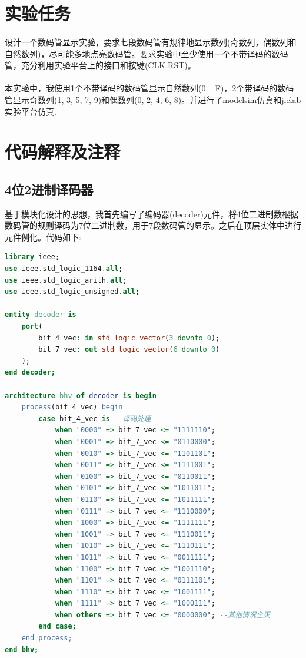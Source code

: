 \documentclass[UTF8, onecolumn, a4paper]{article}
\begin{document}
\section{实验任务}
\paragraph*{}
设计一个数码管显示实验，要求七段数码管有规律地显示数列(奇数列，偶数列和自然数列)，尽可能多地点亮数码管。要求实验中至少使用一个不带译码的数码管，充分利用实验平台上的接口和按键(CLK,RST)。
\paragraph*{}
本实验中，我使用1个不带译码的数码管显示自然数列(0 ~ F)，2个带译码的数码管显示奇数列(1, 3, 5, 7, 9)和偶数列(0, 2, 4, 6, 8)。并进行了modelsim仿真和jielab实验平台仿真.

\section{代码解释及注释}
\subsection{4位2进制译码器}
基于模块化设计的思想，我首先编写了编码器(decoder)元件，将4位二进制数根据数码管的规则译码为7位二进制数，用于7段数码管的显示。之后在顶层实体中进行元件例化。代码如下:

\begin{lstlisting}[language={VHDL}, title={decoder.vhd}]
library ieee;
use ieee.std_logic_1164.all;
use ieee.std_logic_arith.all;
use ieee.std_logic_unsigned.all;

entity decoder is
	port(
		bit_4_vec: in std_logic_vector(3 downto 0);
		bit_7_vec: out std_logic_vector(6 downto 0)
	);
end decoder;

architecture bhv of decoder is begin
	process(bit_4_vec) begin
		case bit_4_vec is --译码处理
			when "0000" => bit_7_vec <= "1111110";
			when "0001" => bit_7_vec <= "0110000";
			when "0010" => bit_7_vec <= "1101101";
			when "0011" => bit_7_vec <= "1111001";
			when "0100" => bit_7_vec <= "0110011";
			when "0101" => bit_7_vec <= "1011011";
			when "0110" => bit_7_vec <= "1011111";
			when "0111" => bit_7_vec <= "1110000";
			when "1000" => bit_7_vec <= "1111111";
			when "1001" => bit_7_vec <= "1110011";
			when "1010" => bit_7_vec <= "1110111";
			when "1011" => bit_7_vec <= "0011111";
			when "1100" => bit_7_vec <= "1001110";
			when "1101" => bit_7_vec <= "0111101";
			when "1110" => bit_7_vec <= "1001111";
			when "1111" => bit_7_vec <= "1000111";
			when others => bit_7_vec <= "0000000"; --其他情况全灭
		end case;
	end process;
end bhv;
\end{lstlisting}
\end{document}

